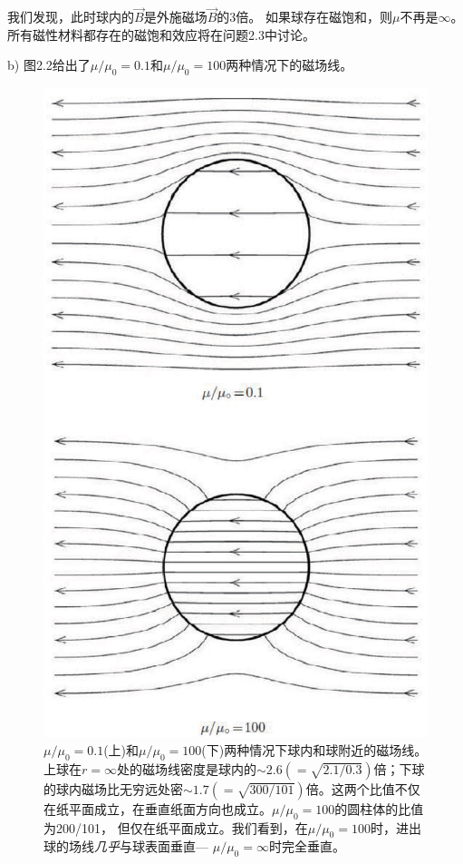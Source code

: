 我们发现，此时球内的$\vec{B}$是外施磁场$\vec{B}$的3倍。
如果球存在磁饱和，则$\mu$不再是$\infty$。
所有磁性材料都存在的磁饱和效应将在问题2.3中讨论。

b) 图2.2给出了$\mu/\mu_0=0.1$和$\mu/\mu_0=100$两种情况下的磁场线。

\begin{figure}[htbp]
  \centering
 \includegraphics[scale=0.6]{chpt2/figs/fig2.2.eps}
  \caption{$\mu/\mu_0=0.1$(上)和$\mu/\mu_0=100$(下)两种情况下球内和球附近的磁场线。上球在$r=\infty$处的磁场线密度是球内的$\sim 2.6(=\sqrt{2.1/0.3})$倍；下球的球内磁场比无穷远处密$\sim 1.7(=\sqrt{300/101})$倍。这两个比值不仅在纸平面成立，在垂直纸面方向也成立。$\mu/\mu_0=100$的圆柱体的比值为200/101，
  但仅在纸平面成立。我们看到，在$\mu/\mu_0=100$时，进出球的场线\textit{几乎}与球表面垂直---
  $\mu/\mu_0=\infty$时完全垂直。}
\end{figure}

